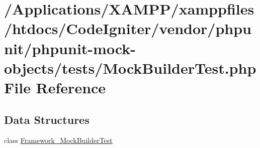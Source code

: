 \hypertarget{_mock_builder_test_8php}{}\section{/\+Applications/\+X\+A\+M\+P\+P/xamppfiles/htdocs/\+Code\+Igniter/vendor/phpunit/phpunit-\/mock-\/objects/tests/\+Mock\+Builder\+Test.php File Reference}
\label{_mock_builder_test_8php}
\subsection*{Data Structures}
\begin{DoxyCompactItemize}
\item 
class \mbox{\hyperlink{class_framework___mock_builder_test}{Framework\+\_\+\+Mock\+Builder\+Test}}
\end{DoxyCompactItemize}
